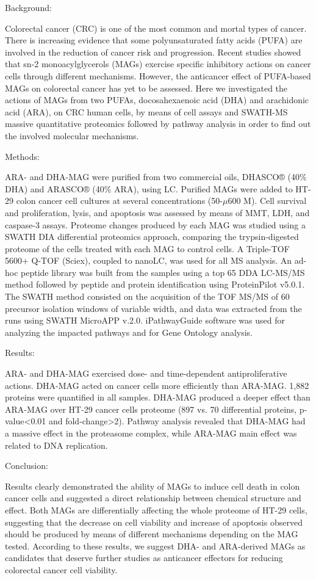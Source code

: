 {Background:

Colorectal cancer (CRC) is one of the most common and mortal types of cancer. There is increasing evidence that some polyunsaturated fatty acids (PUFA) are involved in the reduction of cancer risk and progression. Recent studies showed that sn-2 monoacylglycerols (MAGs) exercise specific inhibitory actions on cancer cells through different mechanisms. However, the anticancer effect of PUFA-based MAGs on colorectal cancer has yet to be assessed. Here we investigated the actions of MAGs from two PUFAs, docosahexaenoic acid (DHA) and arachidonic acid (ARA), on CRC human cells, by means of cell assays and SWATH-MS massive quantitative proteomics followed by pathway analysis in order to find out the involved molecular mechanisms.

Methods:

ARA- and DHA-MAG were purified from two commercial oils, DHASCO® (40\% DHA) and ARASCO® (40\% ARA), using LC. Purified MAGs were added to HT-29 colon cancer cell cultures at several concentrations (50-$\mu$600 M). Cell survival and proliferation, lysis, and apoptosis was assessed by means of MMT, LDH, and caspase-3 assays. Proteome changes produced by each MAG was studied using a SWATH DIA differential proteomics approach, comparing the trypsin-digested proteome of the cells treated with each MAG to control cells. A Triple-TOF 5600+ Q-TOF (Sciex), coupled to nanoLC, was used for all MS analysis. An ad-hoc peptide library was built from the samples using a top 65 DDA LC-MS/MS method followed by peptide and protein identification using ProteinPilot v5.0.1. The SWATH method consisted on the acquisition of the TOF MS/MS of 60 precursor isolation windows of variable width, and data was extracted from the runs using SWATH MicroAPP v.2.0. iPathwayGuide software was used for analyzing the impacted pathways and for Gene Ontology analysis.

Results:

ARA- and DHA-MAG exercised dose- and time-dependent antiproliferative actions. DHA-MAG acted on cancer cells more efficiently than ARA-MAG. 1,882 proteins were quantified in all samples. DHA-MAG produced a deeper effect than ARA-MAG over HT-29 cancer cells proteome (897 vs. 70 differential proteins, p-value<0.01 and fold-change>2). Pathway analysis revealed that DHA-MAG had a massive effect in the proteasome complex, while ARA-MAG main effect was related to DNA replication.

Conclusion:

Results clearly demonstrated the ability of MAGs to induce cell death in colon cancer cells and suggested a direct relationship between chemical structure and effect. Both MAGs are differentially affecting the whole proteome of HT-29 cells, suggesting that the decrease on cell viability and increase of apoptosis observed should be produced by means of different mechanisms depending on the MAG tested. According to these results, we suggest DHA- and ARA-derived MAGs as candidates that deserve further studies as anticancer effectors for reducing colorectal cancer cell viability.


}
